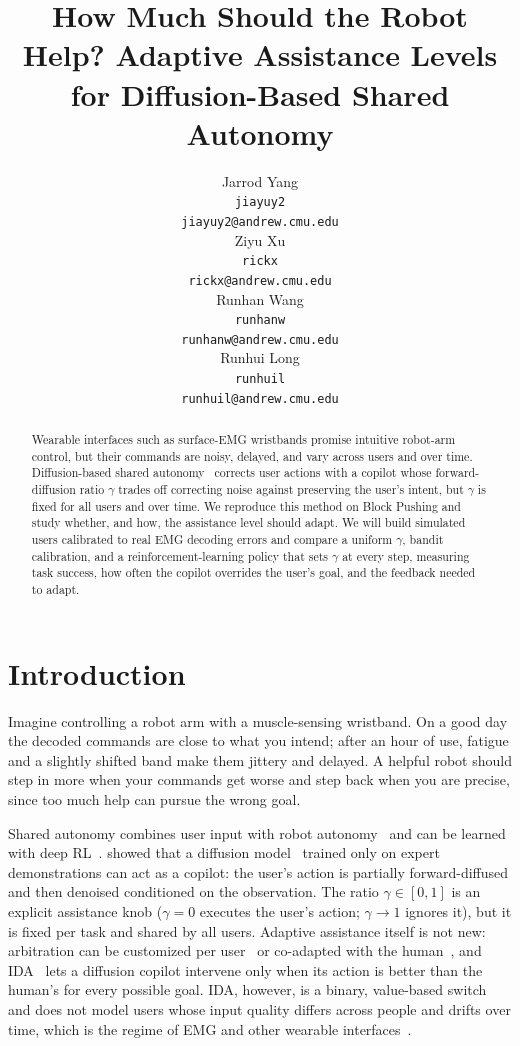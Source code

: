 \documentclass{article}
\title{How Much Should the Robot Help? Adaptive Assistance Levels for Diffusion-Based Shared Autonomy}
\author{
  Jarrod Yang \\
  \texttt{jiayuy2} \\
  \texttt{jiayuy2@andrew.cmu.edu} \\
  \And
  Ziyu Xu \\
  \texttt{rickx} \\
  \texttt{rickx@andrew.cmu.edu} \\
  \And
  Runhan Wang \\
  \texttt{runhanw} \\
  \texttt{runhanw@andrew.cmu.edu} \\
  \And
  Runhui Long \\
  \texttt{runhuil} \\
  \texttt{runhuil@andrew.cmu.edu} \\
}
\begin{document}
\maketitle


\begin{abstract}
Wearable interfaces such as surface-EMG wristbands promise intuitive robot-arm control, but their commands are noisy, delayed, and vary across users and over time. Diffusion-based shared autonomy~\citep{yoneda2023noise} corrects user actions with a copilot whose forward-diffusion ratio $\gamma$ trades off correcting noise against preserving the user's intent, but $\gamma$ is fixed for all users and over time. We reproduce this method on Block Pushing and study whether, and how, the assistance level should adapt. We will build simulated users calibrated to real EMG decoding errors and compare a uniform $\gamma$, bandit calibration, and a reinforcement-learning policy that sets $\gamma$ at every step, measuring task success, how often the copilot overrides the user's goal, and the feedback needed to adapt.
\end{abstract}



\section{Introduction}

Imagine controlling a robot arm with a muscle-sensing wristband. On a good day the decoded commands are close to what you intend; after an hour of use, fatigue and a slightly shifted band make them jittery and delayed. A helpful robot should step in more when your commands get worse and step back when you are precise, since too much help can pursue the wrong goal.

Shared autonomy combines user input with robot autonomy~\citep{dragan2013policy, javdani2015shared} and can be learned with deep RL~\citep{reddy2018shared, schaff2020residual}. \citet{yoneda2023noise} showed that a diffusion model~\citep{ho2020ddpm, chi2023diffusion} trained only on expert demonstrations can act as a copilot: the user's action is partially forward-diffused and then denoised conditioned on the observation. The ratio $\gamma\in[0,1]$ is an explicit assistance knob ($\gamma=0$ executes the user's action; $\gamma\to1$ ignores it), but it is fixed per task and shared by all users. Adaptive assistance itself is not new: arbitration can be customized per user~\citep{gopinath2017customized} or co-adapted with the human~\citep{nikolaidis2017mutual}, and IDA~\citep{mcmahan2024ida} lets a diffusion copilot intervene only when its action is better than the human's for every possible goal. IDA, however, is a binary, value-based switch and does not model users whose input quality differs across people and drifts over time, which is the regime of EMG and other wearable interfaces~\citep{losey2020latent}.
\end{document}
